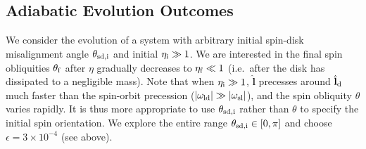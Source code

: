 \documentclass[twocolumn,twocolappendix]{aastex63}
\newcommand*{\abs}[1]{\left|#1\right|}
\newcommand*{\bsmb}[1]{\boldsymbol{\mathbf{#1}}}
\newcommand*{\uv}[1]{\hat{\bsmb{#1}}}
\begin{document}
\subsection{Adiabatic Evolution Outcomes}\label{ss:ad_ensemble}

We consider the evolution of a system with arbitrary initial spin-disk
misalignment angle $\theta_{\rm sd, i}$ and initial $\eta_{\rm i} \gg 1$. We are
interested in the final spin obliquities $\theta_{\rm f}$ after $\eta$ gradually
decreases to $\eta_{\rm f} \ll 1$ (i.e.\ after the disk has dissipated to a
negligible mass). Note that when $\eta_{\rm i} \gg 1$, $\uv{l}$ precesses
around $\uv{l}_{\rm d}$ much faster than the spin-orbit precession
($\abs{\omega_{\rm ld}} \gg \abs{\omega_{\rm sl}}$), and the spin obliquity
$\theta$ varies rapidly. It is thus more appropriate to use $\theta_{\rm sd, i}$
rather than $\theta$ to specify the initial spin orientation. We explore the
entire range $\theta_{\rm sd, i} \in [0, \pi]$ and choose $\epsilon = 3 \times
10^{-4}$ (see above).
\end{document}
